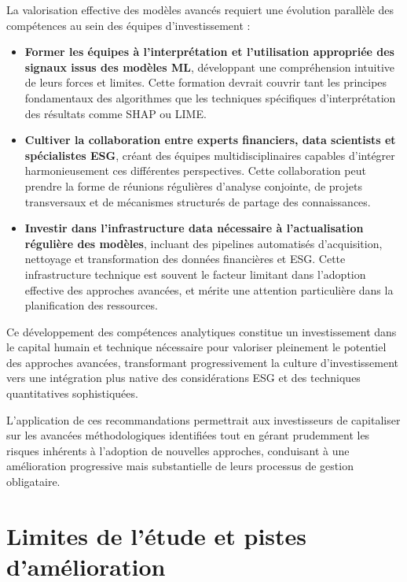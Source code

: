 La valorisation effective des modèles avancés requiert une évolution parallèle des compétences au sein des équipes d'investissement :
\begin{itemize}
    \item \textbf{Former les équipes à l'interprétation et l'utilisation appropriée des signaux issus des modèles ML}, développant une compréhension intuitive de leurs forces et limites. Cette formation devrait couvrir tant les principes fondamentaux des algorithmes que les techniques spécifiques d'interprétation des résultats comme SHAP ou LIME.
    
    \item \textbf{Cultiver la collaboration entre experts financiers, data scientists et spécialistes ESG}, créant des équipes multidisciplinaires capables d'intégrer harmonieusement ces différentes perspectives. Cette collaboration peut prendre la forme de réunions régulières d'analyse conjointe, de projets transversaux et de mécanismes structurés de partage des connaissances.
    
    \item \textbf{Investir dans l'infrastructure data nécessaire à l'actualisation régulière des modèles}, incluant des pipelines automatisés d'acquisition, nettoyage et transformation des données financières et ESG. Cette infrastructure technique est souvent le facteur limitant dans l'adoption effective des approches avancées, et mérite une attention particulière dans la planification des ressources.
\end{itemize}

Ce développement des compétences analytiques constitue un investissement dans le capital humain et technique nécessaire pour valoriser pleinement le potentiel des approches avancées, transformant progressivement la culture d'investissement vers une intégration plus native des considérations ESG et des techniques quantitatives sophistiquées.

L'application de ces recommandations permettrait aux investisseurs de capitaliser sur les avancées méthodologiques identifiées tout en gérant prudemment les risques inhérents à l'adoption de nouvelles approches, conduisant à une amélioration progressive mais substantielle de leurs processus de gestion obligataire.

\section*{Limites de l'étude et pistes d'amélioration}

